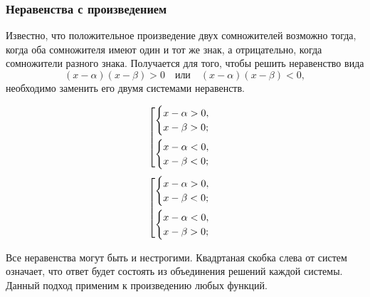 \documentclass[algebra,twocolumn]{pum}
\date{14.04.20}
\newenvironment{sqcases}{%
  \left[
    \begin{gathered}
}{%
    \end{gathered}
  \right.
}
\begin{document}
\subsubsection*{Неравенства с произведением}
Известно, что положительное произведение двух сомножителей возможно тогда, когда оба сомножителя имеют один и тот же знак, а отрицательно, когда сомножители разного знака. Получается для того, чтобы решить неравенство вида
\begin{equation*}
  (x-\alpha)(x-\beta)>0\quad \text{или}\quad (x-\alpha)(x-\beta)<0,
\end{equation*}
необходимо заменить его двумя системами неравенств.
\begin{tcbitemize}[raster columns=2]
  \label{tcb:systems}
  \tcbitem[squeezed title={$(x-\alpha)(x-\beta)>0$}]
  \vspace{-0.5cm}
  \begin{equation*}
      \begin{sqcases}
        \begin{cases}
        x-\alpha>0,\\ x-\beta>0;
        \end{cases} \\
        \begin{cases}
        x-\alpha<0,\\ x-\beta<0;
        \end{cases}
      \end{sqcases}
  \end{equation*}
  \tcbitem[squeezed title={$(x-\alpha)(x-\beta)<0$}]
  \vspace{-0.5cm}
  \begin{equation*}
    \begin{sqcases}
      \begin{cases}
      x-\alpha>0,\\ x-\beta<0;
      \end{cases} \\
      \begin{cases}
      x-\alpha<0,\\ x-\beta>0;
      \end{cases}
    \end{sqcases}
  \end{equation*}
\end{tcbitemize}
Все неравенства могут быть и нестрогими. Квадртаная скобка слева от систем означает, что ответ будет состоять из объединения решений каждой системы. Данный подход применим к произведению любых функций.
\end{document}
